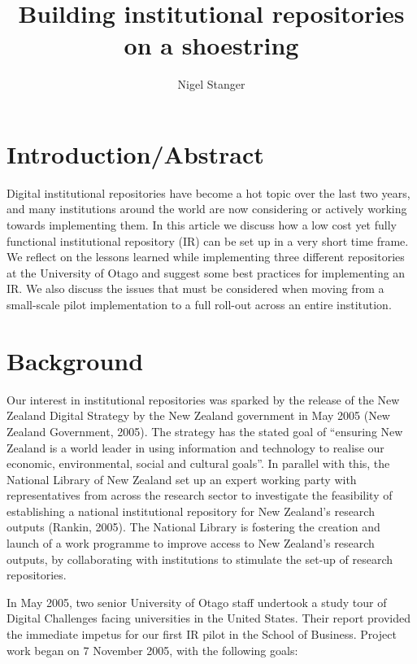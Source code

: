\documentclass[12pt,pdftex,a4paper,titlepage]{article}
\title{Building institutional repositories on a shoestring}
\author{Nigel Stanger}
\date{}
\begin{document}
\maketitle


\section{Introduction/Abstract}

Digital institutional repositories have become a hot topic over the last two years, and many institutions around the world are now considering or actively working towards implementing them. In this article we discuss how a low cost yet fully functional institutional repository (IR) can be set up in a very short time frame. We reflect on the lessons learned while implementing three different repositories at the University of Otago and suggest some best practices for implementing an IR. We also discuss the issues that must be considered when moving from a small-scale pilot implementation to a full roll-out across an entire institution.


\section{Background}

Our interest in institutional repositories was sparked by the release of the New Zealand Digital Strategy by the New Zealand government in May 2005 (New Zealand Government, 2005). The strategy has the stated goal of ``ensuring New Zealand is a world leader in using information and technology to realise our economic, environmental, social and cultural goals''. In parallel with this, the National Library of New Zealand set up an expert working party with representatives from across the research sector to investigate the feasibility of establishing a national institutional repository for New Zealand's research outputs (Rankin, 2005). The National Library is fostering the creation and launch of a work programme to improve access to New Zealand's research outputs, by collaborating with institutions to stimulate the set-up of research repositories.

In May 2005, two senior University of Otago staff undertook a study tour of Digital Challenges facing universities in the United States. Their report provided the immediate impetus for our first IR pilot in the School of Business. Project work began on 7 November 2005, with the following goals:
 
\end{document}
